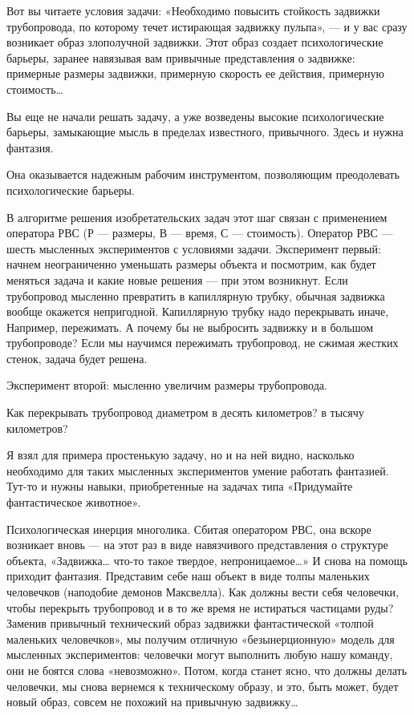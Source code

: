 Вот вы  читаете условия  задачи: «Необходимо  повысить стойкость  задвижки
трубопровода, по которому  течет истирающая  задвижку пульпа», —  и у  вас
сразу  возникает   образ   злополучной  задвижки.   Этот   образ   создает
психологические барьеры, заранее навязывая  вам привычные представления  о
задвижке: примерные  размеры  задвижки, примерную  скорость  ее  действия,
примерную стоимость…

Вы еще не начали  решать задачу, а  уже возведены высокие  психологические
барьеры, замыкающие мысль в пределах известного, привычного. Здесь и нужна
фантазия.

Она оказывается  надежным рабочим  инструментом, позволяющим  преодолевать
психологические барьеры.

В алгоритме решения  изобретательских задач этот шаг  связан с применением
оператора РВС  (Р —  размеры, В —  время, С —  стоимость). Оператор  РВС —
шесть  мысленных экспериментов  с  условиями  задачи. Эксперимент  первый:
начнем  неограниченно уменьшать  размеры  объекта и  посмотрим, как  будет
меняться  задача  и  какие  новые  решения  —  при  этом  возникнут.  Если
трубопровод  мысленно превратить  в капиллярную  трубку, обычная  задвижка
вообще окажется  непригодной. Капиллярную  трубку надо  перекрывать иначе,
Например,  пережимать. А  почему  бы  не выбросить  задвижку  и в  большом
трубопроводе? Если  мы научимся пережимать трубопровод,  не сжимая жестких
стенок, задача будет решена.

Эксперимент второй: мысленно увеличим размеры трубопровода.

Как перекрывать  трубопровод  диаметром  в  десять  километров?  в  тысячу
километров?

Я  взял для  примера  простенькую задачу,  но и  на  ней видно,  насколько
необходимо для  таких мысленных  экспериментов умение  работать фантазией.
Тут-то  и   нужны  навыки,  приобретенные  на   задачах  типа  «Придумайте
фантастическое животное».

Психологическая инерция  многолика.  Сбитая  оператором  РВС,  она  вскоре
возникает вновь — на этот раз в виде навязчивого представления о структуре
объекта, «Задвижка…  что-то  такое  твердое, непроницаемое…»  И  снова  на
помощь  приходит  фантазия.  Представим  себе  наш  объект  в  виде  толпы
маленьких человечков (наподобие демонов Максвелла). Как должны вести  себя
человечки, чтобы  перекрыть трубопровод  и  в то  же время  не  истираться
частицами   руды?   Заменив    привычный   технический   образ    задвижки
фантастической  «толпой   маленьких  человечков»,   мы  получим   отличную
«безынерционную»  модель  для  мысленных  экспериментов:  человечки  могут
выполнить любую нашу  команду, они  не боятся  слова «невозможно».  Потом,
когда станет  ясно,  что должны  делать  человечки, мы  снова  вернемся  к
техническому образу,  и это,  быть  может, будет  новый образ,  совсем  не
похожий на привычную задвижку…

